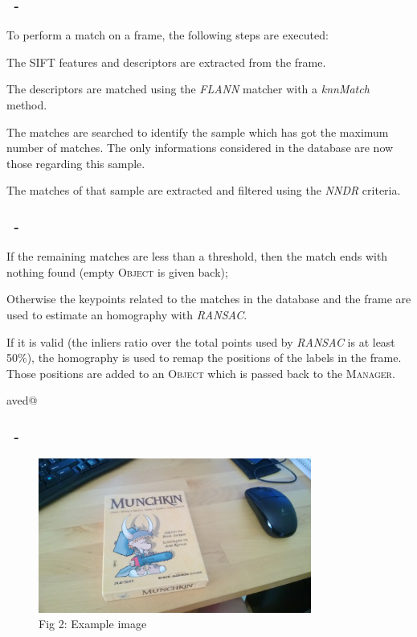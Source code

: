 \documentclass{beamer}
\makeatletter
\newenvironment{cenumerate}{
  \enumerate
  \setcounter{\@enumctr}{\csname saved@\@enumctr\endcsname}
}{
  \expandafter\xdef\csname saved@\@enumctr\endcsname{\the\value{\@enumctr}}
  \endenumerate
}
\newenvironment{cenumerate*}{
  \enumerate
}{
  \expandafter\xdef\csname saved@\@enumctr\endcsname{\the\value{\@enumctr}}
  \endenumerate
}
\makeatother
\begin{document}
  \begin{frame}
    \frametitle{\insertsection\ - \insertsubsection}
    To perform a match on a frame, the following steps are executed:
    \begin{cenumerate*}
      \item The SIFT features and descriptors are extracted from the frame.
      \item The descriptors are matched using the \emph{FLANN} matcher with
        a \emph{knnMatch} method.
      \item The matches are searched to identify the sample which has got 
        the maximum number of matches. The only informations considered in
        the database are now those regarding this sample.
      \item The matches of that sample are extracted and filtered using the
        \emph{NNDR} criteria.
    \end{cenumerate*}
  \end{frame}

  \begin{frame}
    \frametitle{\insertsection\ - \insertsubsection}
    \begin{cenumerate}
      \item If the remaining matches are less than a threshold, then the
	 	match ends with nothing found (empty \textsc{Object} is given back);
      \item Otherwise the keypoints related to the matches in the database and
        the frame are used to estimate an homography with \emph{RANSAC}.
      \item If it is valid (the inliers ratio over the total points used by
        \emph{RANSAC} is at least 50\%), the homography is used to remap the positions
        of the labels in the frame. Those positions are added to an
        \textsc{Object} which is passed back to the \textsc{Manager}.
    \end{cenumerate}
  \end{frame}

  \begin{frame}
    \frametitle{\insertsection\ - \insertsubsection}
	\begin{figure}
		\centering
		\includegraphics[width=0.8\textwidth]{images/sample.jpg}\\
		Fig 2: Example image
	\end{figure}
  \end{frame}
\end{document}
